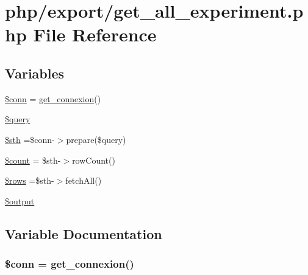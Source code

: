 \hypertarget{export_2get__all__experiment_8php}{\section{php/export/get\-\_\-all\-\_\-experiment.php File Reference}
\label{export_2get__all__experiment_8php}
}
\subsection*{Variables}
\begin{DoxyCompactItemize}
\item 
\hyperlink{export_2get__all__experiment_8php_aa8a5a87b9c1a6a0819b88447cbe41877}{\$conn} = \hyperlink{php__functions_8php_ace18bc10f3fd08f92688ac743e0d8c2e}{get\-\_\-connexion}()
\item 
\hyperlink{export_2get__all__experiment_8php_af59a5f7cd609e592c41dc3643efd3c98}{\$query}
\item 
\hyperlink{export_2get__all__experiment_8php_afa9126f9664959c02795be300a135f93}{\$sth} =\$conn-\/$>$prepare(\$query)
\item 
\hyperlink{export_2get__all__experiment_8php_af789423037bbc89dc7c850e761177570}{\$count} = \$sth-\/$>$row\-Count()
\item 
\hyperlink{export_2get__all__experiment_8php_ace2ec39e7df3899fa8df9640ec274b03}{\$rows} =\$sth-\/$>$fetch\-All()
\item 
\hyperlink{export_2get__all__experiment_8php_a73004ce9cd673c1bfafd1dc351134797}{\$output}
\end{DoxyCompactItemize}


\subsection{Variable Documentation}
\hypertarget{export_2get__all__experiment_8php_aa8a5a87b9c1a6a0819b88447cbe41877}{
\subsubsection[{\$conn}]{\setlength{\rightskip}{0pt plus 5cm}\$conn = {\bf get\-\_\-connexion}()}}\label{export_2get__all__experiment_8php_aa8a5a87b9c1a6a0819b88447cbe41877}


